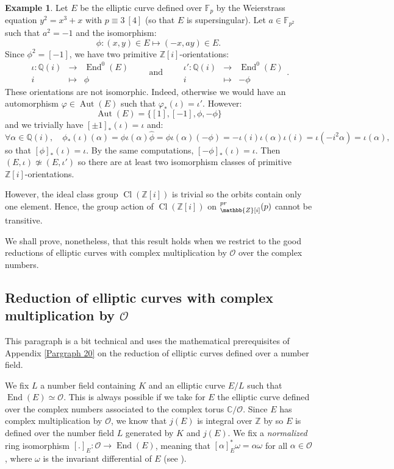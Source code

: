\documentclass[a4paper,10pt,notitlepage]{report}
\theoremstyle{definition}
\theoremstyle{plain}
\theoremstyle{definition}
\newtheorem{Example}[Definition]{Example}
\newcommand{\Z}{\mathbb{Z}}
\newcommand{\Q}{\mathbb{Q}}
\newcommand{\C}{\mathbb{C}}
\newcommand{\F}{\mathbb{F}}
\newcommand{\mO}{\mathcal{O}}
\renewcommand{\(}{\left(}
\renewcommand{\)}{\right)}
\DeclareMathOperator{\End}{End}
\DeclareMathOperator{\Aut}{Aut}
\DeclareMathOperator{\Cl}{Cl}
\let\SS\relax
\DeclareMathOperator{\SS}{SS}
\begin{document}
\begin{Example}\label{Example 1}
Let $E$ be the elliptic curve defined over $\F_p$ by the Weierstrass equation $y^2=x^3+x$ with $p\equiv 3 \ [4]$ (so that $E$ is supersingular).  Let $a\in\F_{p^2}$ such that $a^2=-1$ and the isomorphism:
\[\phi : (x,y)\in E \longmapsto (-x,ay)\in E.\]
Since $\phi^2=[-1]$,  we have two primitive $\Z[i]$-orientations:
\[\begin{array}{rcl}
\iota : \Q(i) & \longrightarrow & \End^0(E)\\
i & \longmapsto & \phi
\end{array} 
\qquad \mbox{and} \qquad
 \begin{array}{rcl}
\iota' : \Q(i) & \longrightarrow & \End^0(E)\\
i & \longmapsto & -\phi
\end{array}.\]
These orientations are not isomorphic.  Indeed,  otherwise we would have an automorphism $\varphi\in\Aut(E)$ such that $\varphi_*(\iota)=\iota'$.  However:
\[\Aut(E)=\{[1],[-1],\phi,-\phi\}\]
and we trivially have $[\pm 1]_*(\iota)=\iota$ and:
\[\forall \alpha\in \Q(i), \quad \phi_*(\iota)(\alpha)=\phi\iota(\alpha)\widehat{\phi}=\phi\iota(\alpha)(-\phi)=-\iota(i)\iota(\alpha)\iota(i)=\iota(-i^2\alpha)=\iota(\alpha),\]
so that $[\phi]_*(\iota)=\iota$.  By the same computations,  $[-\phi]_*(\iota)=\iota$.  Then $(E,\iota)\not\simeq (E,\iota')$ so there are at least two isomorphism classes of primitive $\Z[i]$-orientations.  

However,  the ideal class group $\Cl(\Z[i])$ is trivial so the orbits contain only one element.  Hence,  the group action of $\Cl(\Z[i])$ on $\SS_{\Z[i]}^{pr}(p)$ cannot be transitive.
\end{Example}

We shall prove,  nonetheless,  that this result holds when we restrict to the good reductions of elliptic curves with complex multiplication by $\mO$ over the complex numbers. 

\subsection{Reduction of elliptic curves with complex multiplication by $\mO$}\label{Paragraph 19}

This paragraph is a bit technical and uses the mathematical prerequisites of Appendix \ref{Pargraph 20} on the reduction of elliptic curves defined over a number field.  

We fix $L$ a number field containing $K$ and an elliptic curve $E/L$ such that $\End(E)\simeq \mO$. This is always possible if we take for $E$ the elliptic curve defined over the complex numbers associated to the complex torus $\C/\mO$.  Since $E$ has complex multiplication by $\mO$,  we know that $j(E)$ is integral over $\Z$ by \cite[Theorem II.6.1]{Silverman2} so $E$ is defined over the number field $L$ generated by $K$ and $j(E)$.  We fix a \emph{normalized} ring isomorphism $[.]_E:\mO\longrightarrow \End(E)$,  meaning that $[\alpha]_E^*\omega=\alpha\omega$ for all $\alpha\in\mO$,  where $\omega$ is the invariant differential of $E$ (see \cite[Proposition II.1.1]{Silverman2}). 
\end{document}
